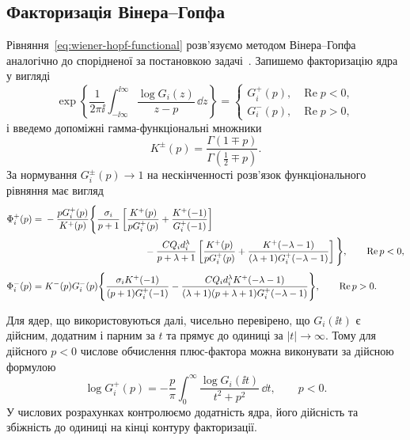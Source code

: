 \subsection{Факторизація Вінера--Гопфа}
\label{subsec:wiener-hopf}

Рівняння~\eqref{eq:wiener-hopf-functional} розв'язуємо методом
Вінера--Гопфа~\cite{noble1958wienerhopf} аналогічно до спорідненої
за постановкою задачі~\cite{KaminskyDudykPolishchuk2024}. Запишемо
факторизацію ядра у вигляді
\begin{equation*}
  \exp\left\{
    \frac{1}{2\pi\ii}
    \int_{-\ii\infty}^{\ii\infty}
      \frac{\log G_i(z)}{z-p}\,\dd z
  \right\}
  =
  \begin{cases}
    G_i^+(p), & \operatorname{Re}p<0,\\
    G_i^-(p), & \operatorname{Re}p>0,
  \end{cases}
\end{equation*}
і введемо допоміжні гамма-функціональні множники
\begin{equation*}
  K^\pm(p)=
  \frac{\Gamma(1\mp p)}{\Gamma(\tfrac12\mp p)}.
\end{equation*}
За нормування $G_i^\pm(p)\to1$ на нескінченності розв'язок
функціонального рівняння має вигляд
\begin{equation}
\label{eq:wiener-hopf-solution}
\begin{aligned}
  \Phi_i^+(p)={}&
  -\frac{pG_i^+(p)}{K^+(p)}
  \Bigg\{
    \frac{\sigma_i}{p+1}
    \left[
      \frac{K^+(p)}{pG_i^+(p)}
      +\frac{K^+(-1)}{G_i^+(-1)}
    \right]\\
  &\hspace{37mm}
    -\frac{CQ_i d_i^\lambda}{p+\lambda+1}
    \left[
      \frac{K^+(p)}{pG_i^+(p)}
      +\frac{K^+(-\lambda-1)}
      {(\lambda+1)G_i^+(-\lambda-1)}
    \right]
  \Bigg\},
  \qquad \operatorname{Re}p<0,\\[3pt]
  \Phi_i^-(p)={}&
  K^-(p)G_i^-(p)
  \Bigg\{
    \frac{\sigma_iK^+(-1)}{(p+1)G_i^+(-1)}
    -\frac{CQ_i d_i^\lambda K^+(-\lambda-1)}
    {(\lambda+1)(p+\lambda+1)G_i^+(-\lambda-1)}
  \Bigg\},
  \qquad \operatorname{Re}p>0.
\end{aligned}
\end{equation}

Для ядер, що використовуються далі, чисельно перевірено, що
$G_i(\ii t)$ є дійсним, додатним і парним за $t$ та прямує до одиниці
за $|t|\to\infty$. Тому для дійсного $p<0$ числове обчислення
плюс-фактора можна виконувати за дійсною формулою
\begin{equation*}
  \log G_i^+(p)
  =-\frac{p}{\pi}\int_0^\infty
    \frac{\log G_i(\ii t)}{t^2+p^2}\,\dd t,
  \qquad p<0.
\end{equation*}
У числових розрахунках контролюємо додатність ядра, його дійсність та
збіжність до одиниці на кінці контуру факторизації.

